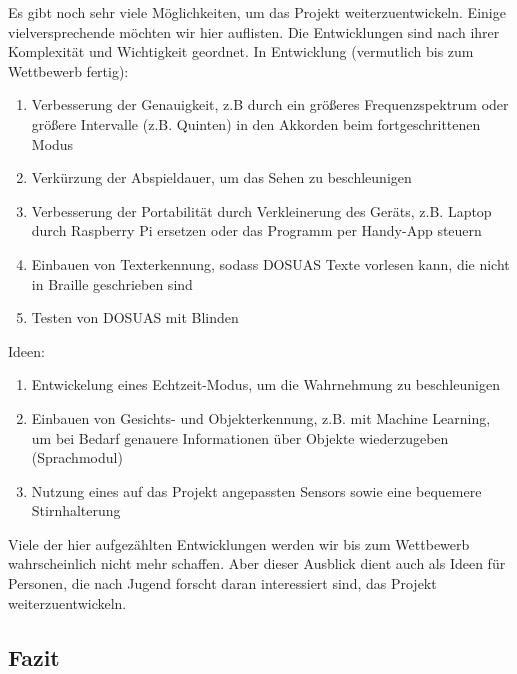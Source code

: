 \documentclass[a4paper,12pt,ngerman]{scrartcl}
\begin{document}
Es gibt noch sehr viele Möglichkeiten, um das Projekt weiterzuentwickeln. Einige vielversprechende
möchten wir hier auflisten. Die Entwicklungen sind nach ihrer Komplexität und Wichtigkeit geordnet.
In Entwicklung (vermutlich bis zum Wettbewerb fertig):
\begin{enumerate}
	\item Verbesserung der Genauigkeit, z.B durch ein größeres Frequenzspektrum oder größere Intervalle (z.B. Quinten) in den
	 Akkorden beim fortgeschrittenen Modus
	\item Verkürzung der Abspieldauer, um das Sehen zu beschleunigen	
	\item Verbesserung der Portabilität durch Verkleinerung des Geräts, z.B. Laptop durch Raspberry Pi ersetzen oder das Programm per
	Handy-App steuern
	\item Einbauen von Texterkennung, sodass DOSUAS Texte vorlesen kann, die nicht in Braille geschrieben sind
	\item Testen von DOSUAS mit Blinden
\end{enumerate}
Ideen:
\begin{enumerate} 
	\item Entwickelung eines Echtzeit-Modus, um die Wahrnehmung zu beschleunigen
	\item Einbauen von Gesichts- und Objekterkennung, z.B. mit Machine Learning, um bei Bedarf genauere 
	Informationen über Objekte wiederzugeben (Sprachmodul)
	\item Nutzung eines auf das Projekt angepassten Sensors sowie eine bequemere Stirnhalterung
\end{enumerate}
Viele der hier aufgezählten Entwicklungen werden wir bis zum Wettbewerb wahrscheinlich nicht 
mehr schaffen. Aber dieser Ausblick dient auch als Ideen für Personen, die nach Jugend forscht 
daran interessiert sind, das Projekt weiterzuentwickeln. 

\subsection{Fazit}
\end{document}
